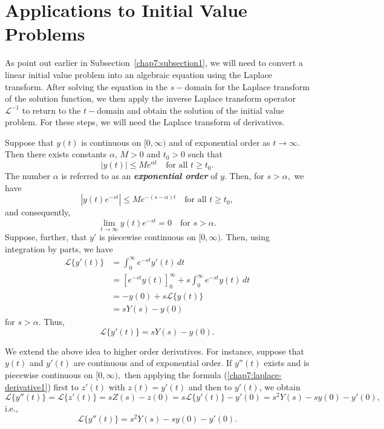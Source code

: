\section{Applications to Initial Value Problems}
As point out earlier in Subsection~\ref{chap7:subsection1}, we will  need to convert a linear initial value problem into an algebraic equation using the Laplace transform. After solving the equation in the $s-$domain for the Laplace transform of the solution function, we then apply the inverse Laplace transform operator $\mathscr{L}^{-1}$ to return to the $t-$domain and obtain the solution of the initial value problem. For these steps, we will need the Laplace transform of derivatives.

Suppose that $y(t)$ is continuous on $[0,\infty)$ and of exponential order as $t\to\infty.$  Then there exists constants $\alpha$, $M>0$ and $t_0>0$ such that 
\[|y(t)| \le M e^{\alpha t}\quad \text{for all } t\ge t_0.\] The number $\alpha$ is referred to as an \textit{\textbf{exponential order}} of $y$. Then, for $s> \alpha,$
we have 
\[|y(t) e^{-st}|\le M e^{-(s-\alpha)t} \quad \text{for all }t\ge t_0,\] and consequently,
\[\lim\limits_{t\to\infty}y(t) e^{-st} =0\quad \text{for }s>\alpha.\]
Suppose, further, that $y'$ is piecewise continuous on $[0,\infty).$  Then, using
 integration by parts, we have 
\begin{equation*}
	\begin{split}
\mathscr{L}\{y'(t)\} &= \int_0^{\infty} e^{-st} y'(t) \, dt \\
&= \left[ e^{-st} y(t) \right]_0^{\infty} + s \int_0^{\infty} e^{-st} y(t) \, dt\\
&= -y(0) + s\mathscr{L}\{y(t)\}\\
&=sY(s) - y(0)
\end{split}
\end{equation*}
 for $s>\alpha.$ Thus, 
\begin{equation}\label{chap7:laplace-derivative1}
	\boxed{
\mathscr{L}\{y'(t)\} = sY(s) - y(0).}
\end{equation}

We extend the above idea to higher order derivatives. For instance,
 suppose that $y(t)$ and $y'(t)$ are  continuous and of exponential order. If $y''(t)$ exists and is piecewise continuous on $[0, \infty),$ then applying the formula (\ref{chap7:laplace-derivative1}) first to $z'(t)$ with $z(t) = y'(t)$ and then to $y'(t)$, we obtain
 \[\mathscr{L}\{y''(t)\} =\mathscr{L}\{z'(t)\} = sZ(s) - z(0) = s\mathscr{L}\{y'(t)\}- y'(0) =s^2Y(s) - sy(0)-y'(0), \] 
 i.e.,
 \begin{equation}\label{chap7:laplace-derivative2}
 	\boxed{
 		\mathscr{L}\{y''(t)\} = s^2Y(s) - sy(0)-y'(0).}
 \end{equation}
 
